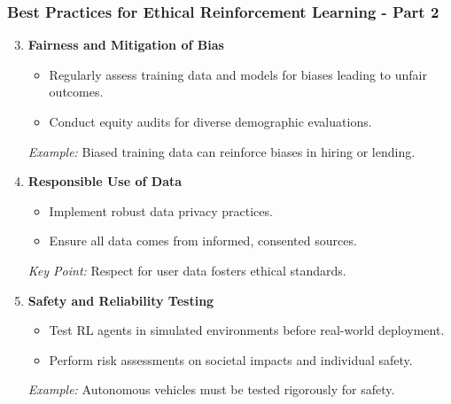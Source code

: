 \documentclass[aspectratio=169]{beamer}
\begin{document}
\begin{frame}[fragile]
    \frametitle{Best Practices for Ethical Reinforcement Learning - Part 2}
    \begin{enumerate}
        \setcounter{enumi}{2} %
        \item \textbf{Fairness and Mitigation of Bias}
            \begin{itemize}
                \item Regularly assess training data and models for biases leading to unfair outcomes.
                \item Conduct equity audits for diverse demographic evaluations.
            \end{itemize}
            \textit{Example:} Biased training data can reinforce biases in hiring or lending.

        \item \textbf{Responsible Use of Data}
            \begin{itemize}
                \item Implement robust data privacy practices.
                \item Ensure all data comes from informed, consented sources.
            \end{itemize}
            \textit{Key Point:} Respect for user data fosters ethical standards.

        \item \textbf{Safety and Reliability Testing}
            \begin{itemize}
                \item Test RL agents in simulated environments before real-world deployment.
                \item Perform risk assessments on societal impacts and individual safety.
            \end{itemize}
            \textit{Example:} Autonomous vehicles must be tested rigorously for safety.
    \end{enumerate}
\end{frame}
\end{document}

